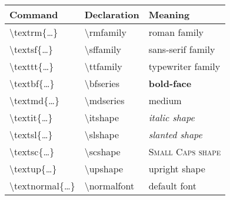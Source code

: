 \documentclass{article}
\renewcommand*\c{\textbackslash\ttfamily}
\begin{document}
\sffamily
\begin{tabular}{lll}
\toprule
\textbf{Command} & \textbf{Declaration} & \textbf{Meaning} \\
\midrule
\c textrm\{\ldots\}     & \c rmfamily   & \normalfont\rmfamily roman family \\
\c textsf\{\ldots\}     & \c sffamily   & \normalfont\sffamily sans-serif family \\
\c texttt\{\ldots\}     & \c ttfamily   & \normalfont\ttfamily typewriter family \\
\c textbf\{\ldots\}     & \c bfseries   & \normalfont\bfseries bold-face \\
\c textmd\{\ldots\}     & \c mdseries   & \normalfont\mdseries medium \\
\c textit\{\ldots\}     & \c itshape    & \normalfont\itshape italic shape \\
\c textsl\{\ldots\}     & \c slshape    & \normalfont\slshape slanted shape \\
\c textsc\{\ldots\}     & \c scshape    & \normalfont\scshape Small Caps shape \\
\c textup\{\ldots\}     & \c upshape    & \normalfont\upshape upright shape \\
\c textnormal\{\ldots\} & \c normalfont & \normalfont default font \\
\bottomrule
\end{tabular}
\end{document}
